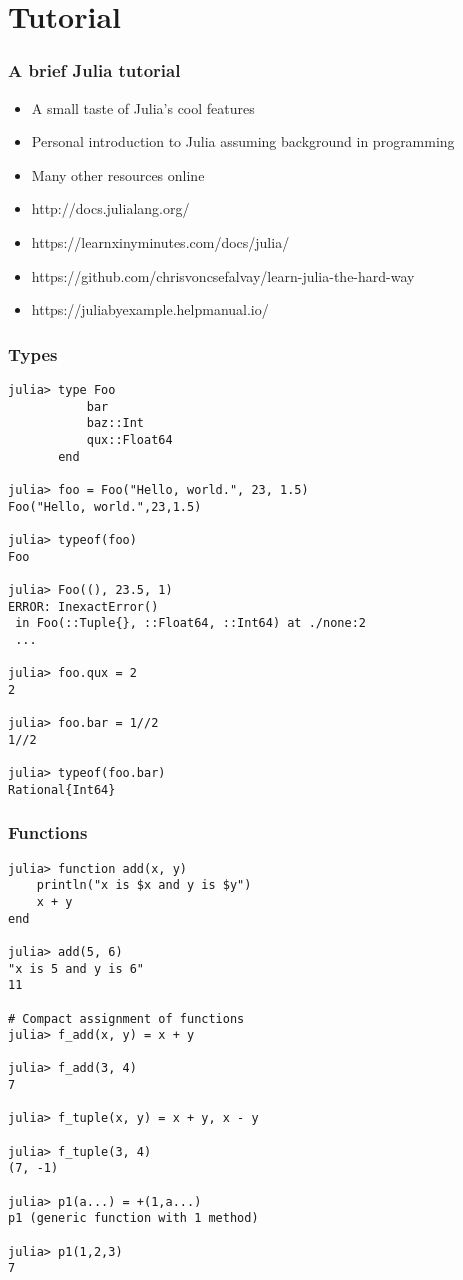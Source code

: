 \section{Tutorial}
\begin{frame}
	\frametitle{A brief Julia tutorial}
  \begin{itemize}
    \item A small taste of Julia's cool features
    \item Personal introduction to Julia assuming background in programming
    \item Many other resources online
    \item http://docs.julialang.org/
    \item https://learnxinyminutes.com/docs/julia/
    \item https://github.com/chrisvoncsefalvay/learn-julia-the-hard-way
    \item https://juliabyexample.helpmanual.io/
  \end{itemize}
\end{frame}

\begin{frame}[fragile]
	\frametitle{Types}
  \begin{tiny}
  \begin{verbatim}
julia> type Foo
           bar
           baz::Int
           qux::Float64
       end

julia> foo = Foo("Hello, world.", 23, 1.5)
Foo("Hello, world.",23,1.5)

julia> typeof(foo)
Foo

julia> Foo((), 23.5, 1)
ERROR: InexactError()
 in Foo(::Tuple{}, ::Float64, ::Int64) at ./none:2
 ...

julia> foo.qux = 2
2

julia> foo.bar = 1//2
1//2

julia> typeof(foo.bar)
Rational{Int64}
  \end{verbatim}
  \end{tiny}
\end{frame}

\begin{frame}[fragile]
	\frametitle{Functions}
  \begin{tiny}
  \begin{verbatim}
julia> function add(x, y)
    println("x is $x and y is $y")
    x + y
end

julia> add(5, 6)
"x is 5 and y is 6"
11

# Compact assignment of functions
julia> f_add(x, y) = x + y

julia> f_add(3, 4)
7

julia> f_tuple(x, y) = x + y, x - y

julia> f_tuple(3, 4)
(7, -1)

julia> p1(a...) = +(1,a...)
p1 (generic function with 1 method)

julia> p1(1,2,3)
7
\end{verbatim}
\end{tiny}
\end{frame}

